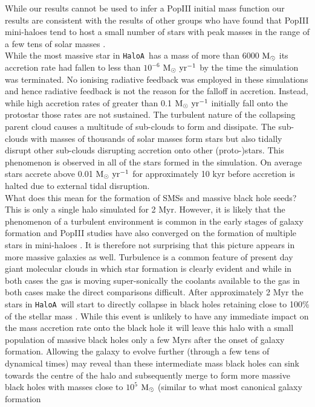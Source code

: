 \documentclass[graphics, twocolumn, usenatbib]{mn2e}
\newcommand{\msolar} {$\rm{M_{\odot}}~$}
\newcommand{\msolaryr} {$\rm{M_{\odot}~yr^{-1}}~$}
\newcommand{\ha} {\texttt{HaloA~}}
\begin{document}
While our results cannot be used to infer a PopIII initial mass function our results
are consistent with the results of other groups who have found that PopIII mini-haloes
tend to host a small number of stars with peak masses in the range of a few tens of
solar masses \citep{Hirano_2014, Susa_2014, Stacy_2016, Skinner_2020}.\\
\indent While the most massive star in \ha has a mass of more than 6000 \msolar its accretion rate had fallen
to less than $10^{-6}$ \msolaryr by the time the simulation was terminated. No ionising radiative
feedback was employed in these simulations and hence radiative feedback is not the reason for
the falloff in accretion. Instead, while high accretion rates of greater than 0.1 \msolaryr initially
fall onto the protostar those rates are not sustained. The turbulent nature of the collapsing parent
cloud causes a multitude of sub-clouds to form and dissipate. The sub-clouds with masses of
thousands of solar masses form stars but also tidally disrupt other sub-clouds disrupting
accretion onto other (proto-)stars. This phenomenon is observed in all of the stars formed in the simulation.
On average stars accrete above 0.01 \msolaryr for approximately 10 kyr before accretion is halted
due to external tidal disruption. \\
\indent What does this mean for the formation of SMSs and massive black hole seeds? This is only a
single halo simulated for 2 Myr. However, it is likely that the phenomenon of a
turbulent environment is common in the early stages of galaxy formation and
PopIII studies have also converged on the formation of multiple stars in mini-haloes
\citep[e.g.][]{Turk_2012}. It is therefore not surprising that this picture appears in
more massive galaxies as well. Turbulence is a common feature of present day giant molecular clouds in
which star formation is clearly evident \citep[e.g.][]{Girichidis_2020, Lee_2020, Krause_2020}
and while in both cases the gas is moving super-sonically the coolants available to the gas in both
cases make the direct comparisons difficult. 
After approximately 2 Myr the stars in \ha will start to directly
collapse in black holes retaining close to 100\% of the stellar mass \citep{Heger_2003}. While this
event is unlikely to have any immediate impact on the mass accretion rate onto the black hole it will
leave this halo with a small population of massive black holes only a few Myrs after the onset of galaxy formation. Allowing the galaxy to evolve further  (through a few tens of dynamical times) may
reveal than these intermediate mass black holes can sink towards the centre of the halo and subsequently merge to form more massive black holes with masses close to $10^5$ \msolar (similar to what most canonical galaxy formation
\end{document}
